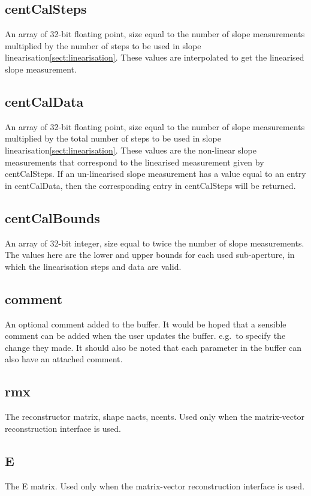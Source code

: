\documentclass[a4,10pt]{article}
\begin{document}
\subsection{centCalSteps}
An array of 32-bit floating point, size equal to the number of slope
measurements multiplied by the number of steps to be used in slope
linearisation\ref{sect:linearisation}.  These values are interpolated
to get the linearised slope measurement.

\subsection{centCalData}
An array of 32-bit floating point, size equal to the number of slope
measurements multiplied by the total number of steps to be used in
slope linearisation\ref{sect:linearisation}.  These values are the
non-linear slope measurements that correspond to the linearised
measurement given by centCalSteps.  If an un-linearised slope
measurement has a value equal to an entry in centCalData, then the
corresponding entry in centCalSteps will be returned.

\subsection{centCalBounds}
An array of 32-bit integer, size equal to twice the number of slope
measurements.  The values here are the lower and upper bounds for each
used sub-aperture, in which the linearisation steps and data are valid.

\subsection{comment}
An optional comment added to the buffer.  It would be hoped that
a sensible comment can be added when the user updates the buffer.
e.g.\ to specify the change they made.  It should also be noted that
each parameter in the buffer can also have an attached comment.

\subsection{rmx}
The reconstructor matrix, shape nacts, ncents.  Used only when the
matrix-vector reconstruction interface is used.

\subsection{E}
The E matrix.  Used only when the
matrix-vector reconstruction interface is used.
\end{document}
